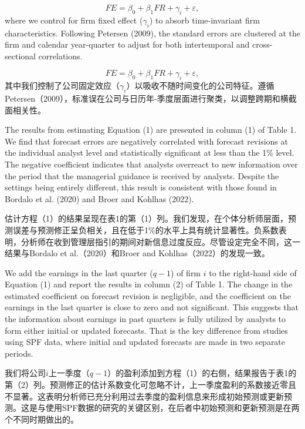 \documentclass[12pt,a4paper]{article}
\newenvironment{original}
  {\par\medskip\noindent\ignorespaces}
  {\par\medskip}
\newenvironment{translation}
  {\par\noindent{\color{transblue}\ignorespaces}}
  {\par\bigskip}
\begin{document}
\begin{original}
\[
FE = \beta_0 + \beta_1 FR + \gamma_i + \varepsilon, \tag{1}
\]
where we control for firm fixed effect ($\gamma_i$) to absorb time-invariant firm characteristics. Following Petersen (2009), the standard errors are clustered at the firm and calendar year-quarter to adjust for both intertemporal and cross-sectional correlations.
\end{original}
\begin{translation}
\[
FE = \beta_0 + \beta_1 FR + \gamma_i + \varepsilon, \tag{1}
\]
其中我们控制了公司固定效应（$\gamma_i$）以吸收不随时间变化的公司特征。遵循Petersen（2009），标准误在公司与日历年-季度层面进行聚类，以调整跨期和横截面相关性。
\end{translation}

\begin{original}
The results from estimating Equation (1) are presented in column (1) of Table 1. We find that forecast errors are negatively correlated with forecast revisions at the individual analyst level and statistically significant at less than the 1\% level. The negative coefficient indicates that analysts overreact to new information over the period that the managerial guidance is received by analysts. Despite the settings being entirely different, this result is consistent with those found in Bordalo et al. (2020) and Broer and Kohlhas (2022).
\end{original}
\begin{translation}
估计方程（1）的结果呈现在表1的第（1）列。我们发现，在个体分析师层面，预测误差与预测修正呈负相关，且在低于1\%的水平上具有统计显著性。负系数表明，分析师在收到管理层指引的期间对新信息过度反应。尽管设定完全不同，这一结果与Bordalo et al.（2020）和Broer and Kohlhas（2022）的发现一致。
\end{translation}

\begin{original}
We add the earnings in the last quarter ($q-1$) of firm $i$ to the right-hand side of Equation (1) and report the results in column (2) of Table 1. The change in the estimated coefficient on forecast revision is negligible, and the coefficient on the earnings in the last quarter is close to zero and not significant. This suggests that the information about earnings in past quarters is fully utilized by analysts to form either initial or updated forecasts. That is the key difference from studies using SPF data, where initial and updated forecasts are made in two separate periods.
\end{original}
\begin{translation}
我们将公司$i$上一季度（$q-1$）的盈利添加到方程（1）的右侧，结果报告于表1的第（2）列。预测修正的估计系数变化可忽略不计，上一季度盈利的系数接近零且不显著。这表明分析师已充分利用过去季度的盈利信息来形成初始预测或更新预测。这是与使用SPF数据的研究的关键区别，在后者中初始预测和更新预测是在两个不同时期做出的。
\end{translation}
\end{document}
